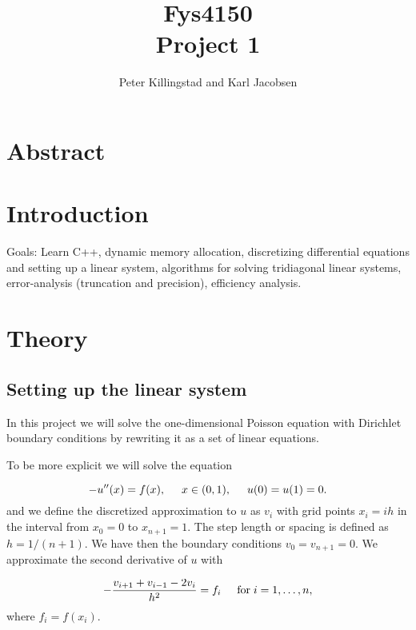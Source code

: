 \documentclass{article}
\title{Fys4150\\Project 1\\ }
\author{Peter Killingstad and Karl Jacobsen}
\begin{document}
	
\maketitle

\tableofcontents

\pagebreak
\section{Abstract}

\section{Introduction}
Goals: Learn C++, dynamic memory allocation, discretizing differential equations and setting up a linear system, algorithms for solving tridiagonal linear systems, error-analysis (truncation and precision), efficiency analysis.

\section{Theory}


\subsection{Setting up the linear system}
In this project we will solve the one-dimensional Poisson equation
with Dirichlet boundary conditions by rewriting it as a set of linear equations.


To be more explicit we will solve the equation

\begin{equation}
-u''(x) = f(x), \hspace{0.5cm} x\in(0,1), \hspace{0.5cm} u(0) = u(1) = 0.
\label{eqn:diffEquation}
\end{equation}
and we define the discretized approximation  to $u$ as $v_i$  with 
grid points $x_i=ih$   in the interval from $x_0=0$ to $x_{n+1}=1$.
The step length or spacing is defined as $h=1/(n+1)$. 
We have then the boundary conditions $v_0 = v_{n+1} = 0$.
We  approximate the second
derivative of $u$ with

\begin{equation}
-\frac{v_{i+1}+v_{i-1}-2v_i}{h^2} = f_i  \hspace{0.5cm} \mathrm{for} \hspace{0.1cm} i=1,\dots, n,
\label{eqn:discretizeEquation}
\end{equation}
where $f_i=f(x_i)$. \\
\end{document}
